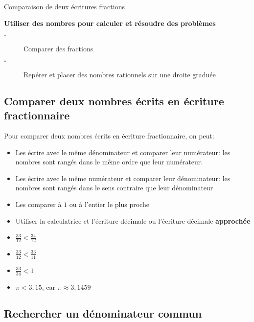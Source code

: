 \begin{titre}

{\LARGE {\color{bleu3}Comparaison de deux écritures fractions}}
\end{titre}



\begin{CpsCol}
\textbf{Utiliser des nombres pour calculer et résoudre des problèmes}
\begin{description}
\item[$\square$] Comparer des fractions
\item[$\square$] Repérer et placer des nombres rationnels sur une droite graduée
\end{description}
\end{CpsCol}



\subsection{Comparer deux nombres écrits en écriture fractionnaire}

Pour comparer deux nombres écrits en écriture fractionnaire, on peut:
\begin{itemize} 
\item Les écrire avec le même dénominateur et comparer leur numérateur: les nombres sont rangés dans le même ordre que leur numérateur.
\item Les écrire avec le même numérateur et comparer leur dénominateur: les nombres sont rangés dans le sens contraire que leur dénominateur
\item Les comparer à $1$ ou à l'entier le plus proche
\item Utiliser la calculatrice et l'écriture décimale ou l'écriture décimale \textbf{approchée}
\end{itemize}


\begin{Ex}   
\begin{itemize}
\item $\frac{33}{12}<\frac{34}{12}$
\item $\frac{33}{12}<\frac{33}{11}$
\item $\frac{33}{34}<1$
\item $\pi<3,15$, car $\pi\approx3,1459$
\end{itemize}
\end{Ex}

\subsection{Rechercher un dénominateur commun}



